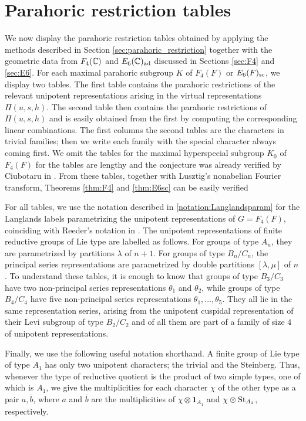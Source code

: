 \section{Parahoric restriction tables}\label{sec:tables}

We now display the parahoric restriction tables obtained by applying the methods described in Section \ref{sec:parahoric_restriction} together with the geometric data from $F_4(\mathbb{C})$ and $E_6(\mathbb{C})_{\mathrm{ad}}$ discussed in Sections \ref{sec:F4} and \ref{sec:E6}. For each maximal parahoric subgroup $K$ of $F_4(F)$ or $E_6(F)_{\mathrm{sc}}$, we display two tables. The first table contains the parahoric restrictions of the relevant unipotent representations arising in the virtual representations $\Pi(u,s,h)$. The second table then contains the parahoric restrictions of $\Pi(u,s,h)$ and is easily obtained from the first by computing the corresponding linear combinations. The first columns the second tables are the characters in trivial families; then we write each family with the special character always coming first. We omit the tables for the maximal hyperspecial subgroup $K_0$ of $F_4(F)$ for the tables are lengthy and the conjecture was already verified by Ciubotaru in \cite{Ciubotaru2020}. From these tables, together with Lusztig's nonabelian Fourier transform, Theorems \ref{thm:F4} and \ref{thm:E6sc} can be easily verified

For all tables, we use the notation described in \ref{notation:Langlandsparam} for the Langlands labels parametrizing the unipotent representations of $G=F_4(F)$, coinciding with Reeder's notation in \cite{Reeder2000}. The unipotent representations of finite reductive groups of Lie type are labelled as follows. For groups of type $A_n$, they are parametrized by partitions $\lambda$ of $n+1$. For groups of type $B_n/C_n$, the principal series representations are parametrized by double partitions $[\lambda,\mu]$ of $n$. To understand these tables, it is enough to know that groups of type $B_3/C_3$ have two non-principal series representations $\theta_1$ and $\theta_2$, while groups of type $B_4/C_4$ have five non-principal series representations $\theta_1,\ldots,\theta_5$. They all lie in the same representation series, arising from the unipotent cuspidal representation of their Levi subgroup of type $B_2/C_2$ and of all them are part of a family of size $4$ of unipotent representations.

Finally, we use the following useful notation shorthand. A finite group of Lie type of type $A_1$ has only two unipotent characters; the trivial and the Steinberg. Thus, whenever the type of reductive quotient is the product of two simple types, one of which is $A_1$, we give the multiplicities for each character $\chi$ of the other type as a pair $a,\overline{b}$, where $a$ and $\overline{b}$ are the multiplicities of $\chi\otimes\mathbf{1}_{A_1}$ and $\chi\otimes\mathrm{St}_{A_1}$, respectively.


\newpage


    
    